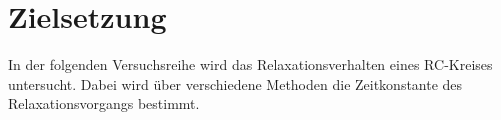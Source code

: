 \section{Zielsetzung}
\label{sec:Zielsetzung}

In der folgenden Versuchsreihe wird das Relaxationsverhalten eines RC-Kreises untersucht. 
Dabei wird über verschiedene Methoden die Zeitkonstante des Relaxationsvorgangs bestimmt.
